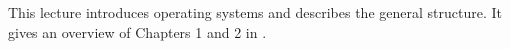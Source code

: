 This lecture introduces operating systems and describes the general structure.
It gives an overview of Chapters 1 and 2 in 
\cite{Silberschatz2009osc,Silberschatz2013intl,Silberschatz2013osc}.
